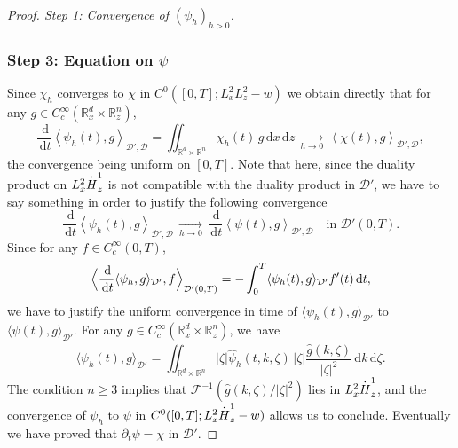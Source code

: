 \documentclass[11pt]{article}
\let\hat\oldhat
\DeclareRobustCommand{\accentset}[2]{\overset{#1}{#2}}
\theoremstyle{definition}
\newcommand*{\overbigdot}[1]{%
\accentset{\mbox{\large\bfseries .}}{#1}}
\let\hat\widehat
\newcommand{\R}{\mathbb{R}}
\newcommand{\ud}{\, {\mathrm{d}}}
\begin{document}
\begin{proof}[Proof. Step 1: Convergence of $(\psi_{h})_{h>0}$]
\subsubsection*{Step 3: Equation on $\psi$} Since $\chi_{h}$ converges to $\chi$ in $C^{0}([0,T];L_{x}^{2}L_{z}^{2}-w)$ we obtain directly that for any $g\in C_{c}^{\infty}(\R_{x}^{d}\times\R_{z}^{n})$,
\[
\frac{\ud}{\ud t}\left\langle\psi_{h}(t),g\right\rangle_{\mathcal{D}',\mathcal{D}}=\iint_{\R^{d}\times\R^{n}}\chi_{h}(t)\,g\ud x\ud z\,\underset{h\to 0}{\to}\,\left\langle\chi(t),g\right\rangle_{\mathcal{D}',\mathcal{D}},
\]
the convergence being uniform on $[0,T]$. Note that here, since the duality product on $L_{x}^{2}\overbigdot{H}_{z}^{1}$ is not compatible with the duality product in $\mathcal{D}'$, we have to say something in order to justify the following convergence
\[
\frac{\ud}{\ud t}\left\langle\psi_{h}(t),g\right\rangle_{\mathcal{D}',\mathcal{D}}\,\underset{h\to 0}{\to}\,\frac{\ud}{\ud t}\left\langle\psi(t),g\right\rangle_{\mathcal{D}',\mathcal{D}}\quad\text{in }\mathcal{D}'(0,T).
\]
Since for any $f\in C_{c}^{\infty}(0,T)$,\vspace*{-3pt}
\[
\Bigl\langle\frac{\ud}{\ud t}\langle\psi_{h},g\rangle_{\mathcal{D}'},f\Bigr\rangle_{\mathcal{D'}(0,T)}=-\int_{0}^{T}\langle\psi_{h}(t),g\rangle_{\mathcal{D}'}f'(t)\ud t,
\]
we have to justify the uniform convergence in time of $\langle\psi_{h}(t),g\rangle_{\mathcal{D}'}$ to $\langle\psi(t),g\rangle_{\mathcal{D}'}$. For any $g\in C_{c}^{\infty}(\R_{x}^{d}\times\R_{z}^{n})$, we have
\[
\langle\psi_{h}(t),g\rangle_{\mathcal{D}'}=\iint_{\R^{d}\times\R^{n}}|\zeta|\hat{\psi}_{h}(t,k,\zeta)\,|\zeta|\overline{\frac{\hat{g}(k,\zeta)}{|\zeta|^{2}}}\ud k\ud\zeta.
\]
The condition $n\geq 3$ implies that $\mathcal{F}^{-1}(\hat{g}(k,\zeta)/|\zeta|^{2})$ lies in $L_{x}^{2}\overbigdot{H}_{z}^{1}$, and the convergence of $\psi_{h}$ to $\psi$ in $C^{0}([0,T];L_{x}^{2}\overbigdot{H}_{z}^{1}-w)$ allows us to conclude. Eventually we have proved that $\partial_{t}\psi=\chi$ in $\mathcal{D}'$.


\end{proof}
\end{document}

